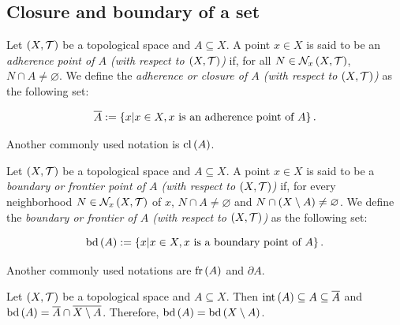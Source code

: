 \subsection{Closure and boundary of a set}

\begin{definition}
  Let $\left(X,\mathcal{T}\right)$ be a topological space and $A\subseteq X$. A point $x\in X$ is said to be an \emph{adherence point of $A$  (with respect to $\left(X,\mathcal{T}\right)$)} if, for all $N\in\mathcal{N}_x\left(X,\mathcal{T}\right)$, $N\cap A\neq\varnothing$. We define the \emph{adherence or closure of $A$ (with respect to $\left(X,\mathcal{T}\right)$)} as the following set:
  
  \begin{equation}
      \overline{A}:=\left\{x\middle|x\in X,\text{$x$ is an adherence point of $A$}\right\}.
  \end{equation}

  Another commonly used notation is $\operatorname{cl}\left(A\right)$.
\end{definition}

\begin{definition}
  Let $\left(X,\mathcal{T}\right)$ be a topological space and $A\subseteq X$. A point $x\in X$ is said to be a \emph{boundary or frontier point of $A$  (with respect to $\left(X,\mathcal{T}\right)$)} if, for every neighborhood $N\in\mathcal{N}_x\left(X,\mathcal{T}\right)$ of $x$, $N\cap A\neq\varnothing$ and $N\cap\left(X\setminus A\right)\neq\varnothing$. We define the \emph{boundary or frontier of $A$ (with respect to $\left(X,\mathcal{T}\right)$)} as the following set:
  
  \begin{equation}
    \operatorname{bd}\left(A\right):=\left\{x\middle|x\in X,\text{$x$ is a boundary point of $A$}\right\}.
  \end{equation}

  Another commonly used notations are $\operatorname{fr}\left(A\right)$ and $\partial A$.
\end{definition}

\begin{remark}
  Let $\left(X,\mathcal{T}\right)$ be a topological space and $A\subseteq X$. Then $\operatorname{int}\left(A\right)\subseteq A\subseteq\overline{A}$ and $\operatorname{bd}\left(A\right)=\overline{A}\cap\overline{X\setminus A}$. Therefore, $\operatorname{bd}\left(A\right)=\operatorname{bd}\left(X\setminus A\right)$.
\end{remark}

